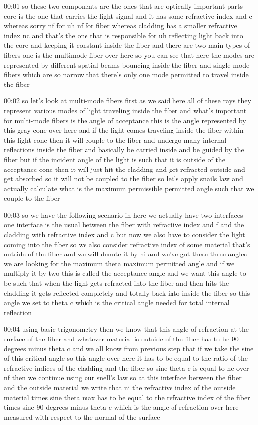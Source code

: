 00:01
so these two components are the ones that are optically
important parts core is the one that carries the light signal
and it has some refractive index and c whereas sorry nf for uh nf for fiber
whereas cladding has a smaller refractive index nc and that's the one that is
responsible for uh reflecting light back into the core and
keeping it constant inside the fiber and there are two main types of fibers one
is the multimode fiber over here so you can see that
here the modes are represented by different spatial
beams bouncing inside the fiber and single mode fibers which are so narrow
that there's only one mode permitted to travel inside the fiber

00:02
so let's look at multi-mode fibers first as we said here all of these rays they
represent various modes of light traveling inside the fiber
and what's important for multi-mode fibers is the angle of acceptance
this is the angle represented by this gray cone over here and if the light
comes traveling inside the fiber within this light cone
then it will couple to the fiber and undergo
many internal reflections inside the fiber
and basically be carried inside and be guided by the fiber
but if the incident angle of the light is such that it is outside
of the acceptance cone then it will just hit the cladding and get refracted
outside and get absorbed so it will not be coupled to the fiber
so let's apply snails law and actually calculate what is the maximum permissible
permitted angle such that we couple to the fiber

00:03
so we have the following scenario in here we actually have
two interfaces one interface is the usual
between the fiber with refractive index and f
and the cladding with refractive index and c but now we also have to consider
the light coming into the fiber so we also consider refractive index of
some material that's outside of the fiber and we will denote it by ni and we've
got these three angles we are looking for the maximum
theta maximum permitted angle and if we multiply it by two this is called
the acceptance angle and we want this angle to be such that
when the light gets refracted into the fiber and then hits the cladding it gets
reflected completely and totally back into
inside the fiber so this angle we set to theta c
which is the critical angle needed for total internal reflection

00:04
using basic trigonometry then we know that this
angle of refraction at the surface of the fiber
and whatever material is outside of the fiber has to be 90 degrees minus theta c
and we all know from previous step that if we take the sine
of this critical angle so this angle over here
it has to be equal to the ratio of the refractive indices
of the cladding and the fiber so sine theta c is equal to nc over nf
then we continue using our snell's law so
at this interface between the fiber and the outside material
we write that ni the refractive index of the outside material
times sine theta max has to be equal to the refractive index of the fiber times
sine 90 degrees minus theta c which is the angle of refraction
over here measured with respect to the normal of the surface

